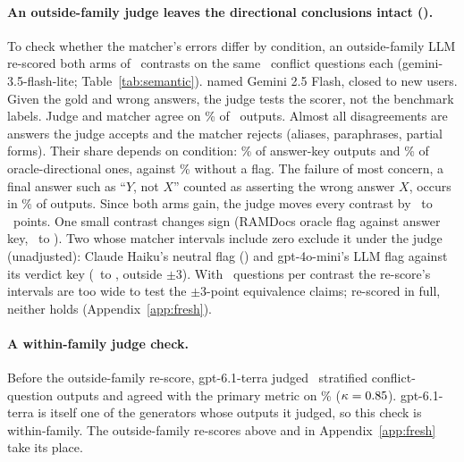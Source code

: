 \paragraph{An outside-family judge leaves the directional conclusions intact ().} To
check whether the matcher's errors differ by condition, an outside-family LLM re-scored both
arms of \semK\ contrasts on the same \semNq\ conflict questions each (gemini-3.5-flash-lite; Table~\ref{tab:semantic}).
 named Gemini 2.5 Flash, closed to new users. Given the gold and wrong answers, the judge tests the
scorer, not the benchmark labels. Judge and matcher agree on \semAgree\% of \semN\ outputs. Almost all
disagreements are answers the judge accepts and the matcher rejects (aliases, paraphrases, partial forms).
Their share depends on condition: \semJudgeOnlyKey\% of answer-key outputs and \semJudgeOnlyDir\% of oracle-directional ones,
against \semJudgeOnlyPlain\% without a flag. The failure of most concern, a final answer such as
``$Y$, not $X$'' counted as asserting the wrong answer $X$, occurs in \semRejected\% of outputs. Since
both arms gain, the judge moves every contrast by \semDidMin\ to \semDidMax\ points. One small contrast changes sign (RAMDocs oracle flag against answer key, \semTwentyThreeRDMiniM\ to \semTwentyThreeRDMiniJ).
Two whose matcher intervals include zero exclude it under the judge (unadjusted): Claude Haiku's neutral flag
(\semNeuCBsHaikuJ) and gpt-4o-mini's LLM flag against its verdict key (\semThirtyCBsMiniM\ to \semThirtyCBsMiniJ, outside $\pm$3). With \semNq\ questions per contrast the re-score's
intervals are too wide to test the $\pm$3-point equivalence claims; re-scored in full, neither holds
(Appendix~\ref{app:fresh}).

\paragraph{A within-family judge check.} Before the outside-family re-score, gpt-6.1-terra judged \judgeN\
stratified conflict-question outputs and agreed with the primary metric on \judgeAgree\% ($\kappa=0.85$).
gpt-6.1-terra is itself one of the generators whose outputs it judged, so this check is within-family. The
outside-family re-scores above and in Appendix~\ref{app:fresh} take its place.

